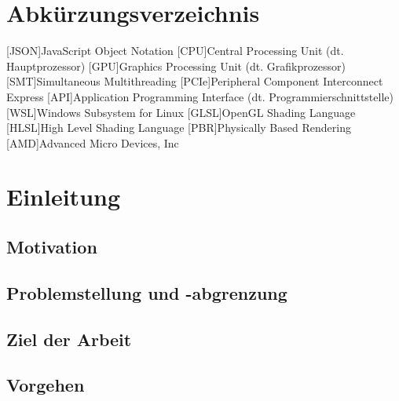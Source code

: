 \documentclass[oneside]{ausarbeitung}
\begin{document}
\chapter*{Abkürzungsverzeichnis}
\begin{acronym}[JSON]  %

[JSON]{JavaScript Object Notation}
[CPU]{Central Processing Unit (dt. Hauptprozessor)}
[GPU]{Graphics Processing Unit (dt. Grafikprozessor)}
[SMT]{Simultaneous Multithreading}
[PCIe]{Peripheral Component Interconnect Express}
[API]{Application Programming Interface (dt. Programmierschnittstelle)}
[WSL]{Windows Subsystem for Linux}
[GLSL]{OpenGL Shading Language}
[HLSL]{High Level Shading Language}
[PBR]{Physically Based Rendering}
[AMD]{Advanced Micro Devices, Inc}
\end{acronym}
\cleardoublepage
{}
\setcounter{page}{1}

\chapter{Einleitung}
\label{cha:einleitung}

\section{Motivation}
\label{sec:motivation}

\section{Problemstellung und -abgrenzung}
\label{sec:problemstellung}

\section{Ziel der Arbeit}
\label{sec:ziel}

\section{Vorgehen}
\label{sec:vorgehen}
\end{document}
